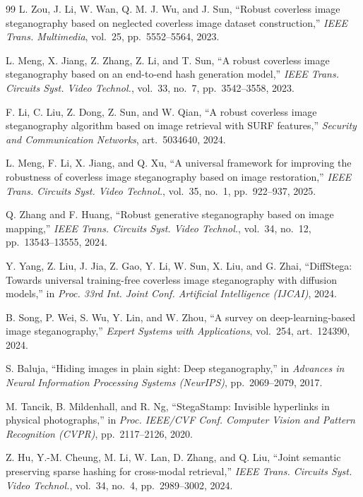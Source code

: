 \documentclass[11pt]{article}
\theoremstyle{definition}
\begin{document}
\begin{thebibliography}{99}
L. Zou, J. Li, W. Wan, Q. M. J. Wu, and J. Sun,
``Robust coverless image steganography based on neglected coverless image dataset construction,''
\emph{IEEE Trans. Multimedia}, vol.~25, pp.~5552--5564, 2023.

L. Meng, X. Jiang, Z. Zhang, Z. Li, and T. Sun,
``A robust coverless image steganography based on an end-to-end hash generation model,''
\emph{IEEE Trans. Circuits Syst. Video Technol.}, vol.~33, no.~7, pp.~3542--3558, 2023.

F. Li, C. Liu, Z. Dong, Z. Sun, and W. Qian,
``A robust coverless image steganography algorithm based on image retrieval with SURF features,''
\emph{Security and Communication Networks}, art.~5034640, 2024.

L. Meng, F. Li, X. Jiang, and Q. Xu,
``A universal framework for improving the robustness of coverless image steganography based on image restoration,''
\emph{IEEE Trans. Circuits Syst. Video Technol.}, vol.~35, no.~1, pp.~922--937, 2025.

Q. Zhang and F. Huang,
``Robust generative steganography based on image mapping,''
\emph{IEEE Trans. Circuits Syst. Video Technol.}, vol.~34, no.~12, pp.~13543--13555, 2024.

Y. Yang, Z. Liu, J. Jia, Z. Gao, Y. Li, W. Sun, X. Liu, and G. Zhai,
``DiffStega: Towards universal training-free coverless image steganography with diffusion models,''
in \emph{Proc. 33rd Int. Joint Conf. Artificial Intelligence (IJCAI)}, 2024.

B. Song, P. Wei, S. Wu, Y. Lin, and W. Zhou,
``A survey on deep-learning-based image steganography,''
\emph{Expert Systems with Applications}, vol.~254, art.~124390, 2024.

S. Baluja,
``Hiding images in plain sight: Deep steganography,''
in \emph{Advances in Neural Information Processing Systems (NeurIPS)}, pp.~2069--2079, 2017.

M. Tancik, B. Mildenhall, and R. Ng,
``StegaStamp: Invisible hyperlinks in physical photographs,''
in \emph{Proc. IEEE/CVF Conf. Computer Vision and Pattern Recognition (CVPR)}, pp.~2117--2126, 2020.

Z. Hu, Y.-M. Cheung, M. Li, W. Lan, D. Zhang, and Q. Liu,
``Joint semantic preserving sparse hashing for cross-modal retrieval,''
\emph{IEEE Trans. Circuits Syst. Video Technol.}, vol.~34, no.~4, pp.~2989--3002, 2024.


\end{thebibliography}
\end{document}
